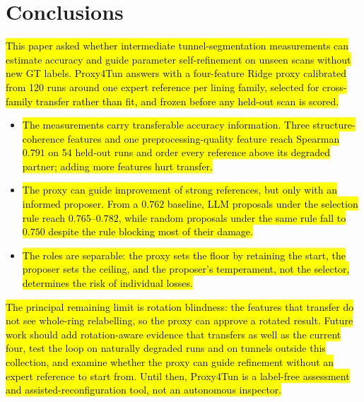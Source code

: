 \documentclass[a4paper,fleqn]{cas-dc}
\begin{document}
{%
\section{Conclusions}\label{sec:conclusions}

\hl{This paper asked whether intermediate tunnel-segmentation measurements can estimate accuracy and guide parameter self-refinement on unseen scans without new GT labels. Proxy4Tun answers with a four-feature Ridge proxy calibrated from 120 runs around one expert reference per lining family, selected for cross-family transfer rather than fit, and frozen before any held-out scan is scored.}

\begin{itemize}
\item \hl{The measurements carry transferable accuracy information. Three structure-coherence features and one preprocessing-quality feature reach Spearman $0.791$ on 54 held-out runs and order every reference above its degraded partner; adding more features hurt transfer.}
\item \hl{The proxy can guide improvement of strong references, but only with an informed proposer. From a $0.762$ baseline, LLM proposals under the selection rule reach $0.765$--$0.782$, while random proposals under the same rule fall to $0.750$ despite the rule blocking most of their damage.}
\item \hl{The roles are separable: the proxy sets the floor by retaining the start, the proposer sets the ceiling, and the proposer's temperament, not the selector, determines the risk of individual losses.}
\end{itemize}

\hl{The principal remaining limit is rotation blindness: the features that transfer do not see whole-ring relabelling, so the proxy can approve a rotated result. Future work should add rotation-aware evidence that transfers as well as the current four, test the loop on naturally degraded runs and on tunnels outside this collection, and examine whether the proxy can guide refinement without an expert reference to start from. Until then, Proxy4Tun is a label-free assessment and assisted-reconfiguration tool, not an autonomous inspector.}


}
\end{document}
